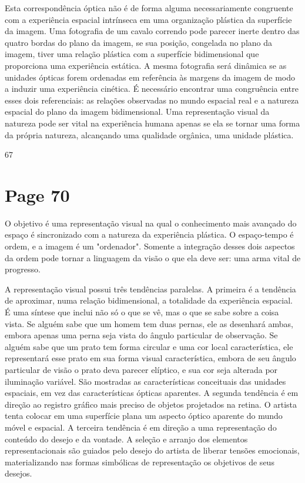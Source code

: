 \documentclass[a4paper]{article}
\begin{document}
Esta correspondência óptica não é de forma alguma necessariamente congruente com a experiência espacial intrínseca em uma organização plástica da superfície da imagem. Uma fotografia de um cavalo correndo pode parecer inerte dentro das quatro bordas do plano da imagem, se sua posição, congelada no plano da imagem, tiver uma relação plástica com a superfície bidimensional que proporciona uma experiência estática. A mesma fotografia será dinâmica se as unidades ópticas forem ordenadas em referência às margens da imagem de modo a induzir uma experiência cinética. É necessário encontrar uma congruência entre esses dois referenciais: as relações observadas no mundo espacial real e a natureza espacial do plano da imagem bidimensional. Uma representação visual da natureza pode ser vital na experiência humana apenas se ela se tornar uma forma da própria natureza, alcançando uma qualidade orgânica, uma unidade plástica.

\par\vspace*{\fill}\hfill 67

\newpage
\section*{Page 70}

O objetivo é uma representação visual na qual o conhecimento mais avançado do espaço é sincronizado com a natureza da experiência plástica. O espaço-tempo é ordem, e a imagem é um "ordenador". Somente a integração desses dois aspectos da ordem pode tornar a linguagem da visão o que ela deve ser: uma arma vital de progresso.

A representação visual possui três tendências paralelas. A primeira é a tendência de aproximar, numa relação bidimensional, a totalidade da experiência espacial. É uma síntese que inclui não só o que se vê, mas o que se sabe sobre a coisa vista. Se alguém sabe que um homem tem duas pernas, ele as desenhará ambas, embora apenas uma perna seja vista do ângulo particular de observação. Se alguém sabe que um prato tem forma circular e uma cor local característica, ele representará esse prato em sua forma visual característica, embora de seu ângulo particular de visão o prato deva parecer elíptico, e sua cor seja alterada por iluminação variável. São mostradas as características conceituais das unidades espaciais, em vez das características ópticas aparentes. A segunda tendência é em direção ao registro gráfico mais preciso de objetos projetados na retina. O artista tenta colocar em uma superfície plana um aspecto óptico aparente do mundo móvel e espacial. A terceira tendência é em direção a uma representação do conteúdo do desejo e da vontade. A seleção e arranjo dos elementos representacionais são guiados pelo desejo do artista de liberar tensões emocionais, materializando nas formas simbólicas de representação os objetivos de seus desejos.
\end{document}
